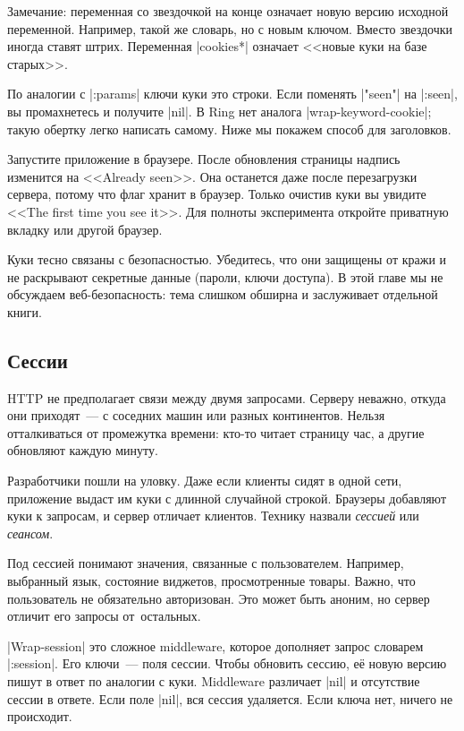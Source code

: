 Замечание: переменная со звездочкой на конце означает новую версию исходной
переменной. Например, такой же словарь, но с новым ключом. Вместо звездочки
иногда ставят штрих. Переменная \spverb|cookies*| означает <<новые куки на базе
старых>>.

По аналогии с \spverb|:params| ключи куки это строки. Если поменять
\spverb|"seen"| на \spverb|:seen|, вы промахнетесь и получите \spverb|nil|. В
Ring нет аналога \spverb|wrap-keyword-cookie|; такую обертку легко написать
самому. Ниже мы покажем способ для заголовков.

Запустите приложение в браузере. После обновления страницы надпись изменится на
<<Already seen>>. Она останется даже после перезагрузки сервера, потому что флаг
хранит в браузер. Только очистив куки вы увидите <<The first time you see
it>>. Для полноты эксперимента откройте приватную вкладку или другой браузер.

Куки тесно связаны с безопасностью. Убедитесь, что они защищены от кражи и не
раскрывают секретные данные (пароли, ключи доступа). В этой главе мы не
обсуждаем веб-безопасность: тема слишком обширна и заслуживает отдельной книги.

\subsection{Сессии}


HTTP не предполагает связи между двумя запросами. Серверу неважно, откуда они
приходят~--- с соседних машин или разных континентов. Нельзя отталкиваться от
промежутка времени: кто-то читает страницу час, а другие обновляют каждую
минуту.

Разработчики пошли на уловку. Даже если клиенты сидят в одной сети, приложение
выдаст им куки с длинной случайной строкой. Браузеры добавляют куки к запросам,
и сервер отличает клиентов. Технику назвали \emph{сессией} или \emph{сеансом}.

Под сессией понимают значения, связанные с пользователем. Например, выбранный
язык, состояние виджетов, просмотренные товары. Важно, что пользователь не
обязательно авторизован. Это может быть аноним, но сервер отличит его запросы
от~остальных.


\spverb|Wrap-session| это сложное middleware, которое дополняет запрос словарем
\spverb|:session|. Его ключи~--- поля сессии. Чтобы обновить сессию, е\"{е} новую
версию пишут в ответ по аналогии с куки. Middleware различает \spverb|nil| и
отсутствие сессии в ответе. Если поле \spverb|nil|, вся сессия удаляется. Если
ключа нет, ничего не происходит.

